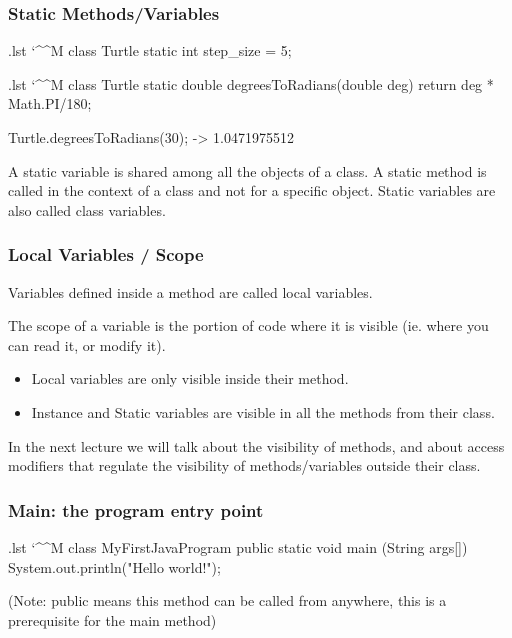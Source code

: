 \documentclass[10pt, handout]{beamer}
\makeatletter
\newenvironment{code}{%
  \begingroup
  \@bsphack
  \immediate\openout\lstvrb@out\jobname.lst
  \let\do\@makeother\dospecials\catcode`\^^M\active
  \def\verbatim@processline{%
    \immediate\write\lstvrb@out{\the\verbatim@line}}%
  \verbatim@start}{%
  \immediate\closeout\lstvrb@out
  \@esphack
  \endgroup

  \begin{alertblock}{}
    
  \end{alertblock}}
\makeatother
\begin{document}
\begin{frame}
  \frametitle{Static Methods/Variables}
    \begin{code}
class Turtle {
  static int step_size = 5;
}
    \end{code}
    \pause
    \begin{code}
class Turtle {
  static double degreesToRadians(double deg) {
    return deg * Math.PI/180;
  }
}

Turtle.degreesToRadians(30); -> 1.0471975512

    \end{code}
    \pause
    \begin{definition}
      A static variable is shared among all the objects of a class.
      A static method is called in the context of a class and not for a specific object.
      Static variables are also called class variables.
    \end{definition}
\end{frame}

\begin{frame}
  \frametitle{Local Variables / Scope}
  \begin{definition}
    Variables defined inside a method are called local variables.

    The scope of a variable is the portion of code where it is visible (ie. where you can read it,
    or modify it).
   \end{definition}

    \begin{itemize}
      \item Local variables are only visible inside their method.
      \item Instance and Static variables are visible in all the methods from their class.
    \end{itemize}

    In the next lecture we will talk about the visibility of methods, and about access modifiers
    that regulate the visibility of methods/variables outside their class.
\end{frame}


\begin{frame}[fragile]
  \frametitle{Main: the program entry point}
  \begin{code}
    class MyFirstJavaProgram{
      public static void main (String args[]) {
        System.out.println("Hello world!");
      }
    }
  \end{code}
  (Note: public means this method can be called from anywhere, this is a prerequisite for
   the main method)
\end{frame}
\end{document}
